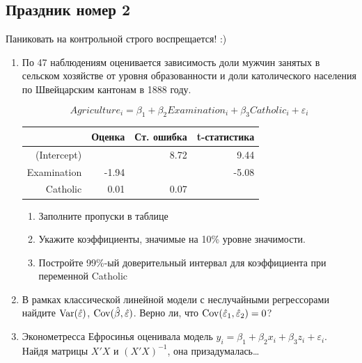 \documentclass[12pt, a4paper]{article}\usepackage[]{graphicx}\usepackage[]{color}
\begin{document}
\subsection{Праздник номер 2}


{\Large Паниковать на контрольной строго воспрещается! :)}

\begin{enumerate}

\item  По 47 наблюдениям оценивается зависимость доли мужчин занятых в сельском хозяйстве от уровня образованности и доли католического населения по Швейцарским кантонам в 1888 году.

\[Agriculture_i=\beta_1+\beta_2 Examination_i+\beta_3 Catholic_i+\varepsilon_i\]





\begin{table}[ht]
\centering
\begin{tabular}{rrrr}
  \hline
 & Оценка & Ст. ошибка & t-статистика \\ 
  \hline
(Intercept) &  & 8.72 & 9.44 \\ 
  Examination & -1.94 &  & -5.08 \\ 
  Catholic & 0.01 & 0.07 &  \\ 
   \hline
\end{tabular}
\end{table}


\begin{enumerate}
\item Заполните пропуски в таблице
\item Укажите коэффициенты, значимые на 10\% уровне значимости.
\item Постройте 99\%-ый доверительный интервал для коэффициента при переменной Catholic
\end{enumerate}

\item В рамках классической линейной модели с неслучайными регрессорами найдите $\operatorname{Var}(\hat{\varepsilon})$, $\operatorname{Cov}(\hat{\beta},\hat{\varepsilon})$. Верно ли, что $\operatorname{Cov}(\hat{\varepsilon}_1,\hat{\varepsilon}_2)=0$?





\item Эконометресса Ефросинья оценивала модель $y_i=\beta_1 + \beta_2 x_i + \beta_3 z_i + \varepsilon_i$. Найдя матрицы $X'X$ и $(X'X)^{-1}$, она призадумалась\ldots


\end{enumerate}
\end{document}
